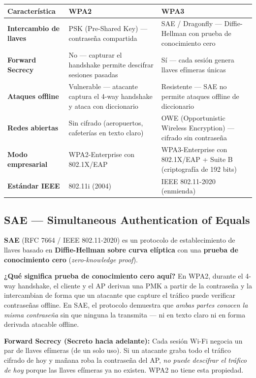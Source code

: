 \begin{center}
\renewcommand{\arraystretch}{1.5}
\begin{tabular}{>{\bfseries}p{3.8cm} p{4.5cm} p{4.5cm}}
\toprule
\textbf{Característica} & \textbf{WPA2} & \textbf{WPA3} \\
\midrule
Intercambio de llaves
    & PSK (Pre-Shared Key) --- contraseña compartida
    & SAE / Dragonfly --- Diffie-Hellman con prueba de conocimiento cero \\
Forward Secrecy
    & No --- capturar el handshake permite descifrar sesiones pasadas
    & Sí --- cada sesión genera llaves efímeras únicas \\
Ataques offline
    & Vulnerable --- atacante captura el 4-way handshake y ataca con diccionario
    & Resistente --- SAE no permite ataques offline de diccionario \\
Redes abiertas
    & Sin cifrado (aeropuertos, cafeterías en texto claro)
    & OWE (Opportunistic Wireless Encryption) --- cifrado sin contraseña \\
Modo empresarial
    & WPA2-Enterprise con 802.1X/EAP
    & WPA3-Enterprise con 802.1X/EAP + Suite B (criptografía de 192 bits) \\
Estándar IEEE
    & 802.11i (2004)
    & IEEE 802.11-2020 (enmienda) \\
\bottomrule
\end{tabular}
\end{center}

\subsection{ SAE --- Simultaneous Authentication of Equals}

\begin{concepto}
\textbf{SAE} (RFC 7664 / IEEE 802.11-2020) es un protocolo de establecimiento
de llaves basado en \textbf{Diffie-Hellman sobre curva elíptica} con una
\textbf{prueba de conocimiento cero} (\textit{zero-knowledge proof}).

\textbf{¿Qué significa prueba de conocimiento cero aquí?}
En WPA2, durante el 4-way handshake, el cliente y el AP derivan una PMK
a partir de la contraseña y la intercambian de forma que un atacante que capture
el tráfico puede verificar contraseñas offline. En SAE, el protocolo demuestra
que \textit{ambas partes conocen la misma contraseña} sin que ninguna la transmita
--- ni en texto claro ni en forma derivada atacable offline.

\vspace{0.5em}
\textbf{Forward Secrecy (Secreto hacia adelante):}
Cada sesión Wi-Fi negocia un par de llaves efímeras (de un solo uso).
Si un atacante graba todo el tráfico cifrado de hoy y mañana roba
la contraseña del AP, \textit{no puede descifrar el tráfico de hoy}
porque las llaves efímeras ya no existen. WPA2 no tiene esta propiedad.
\end{concepto}

